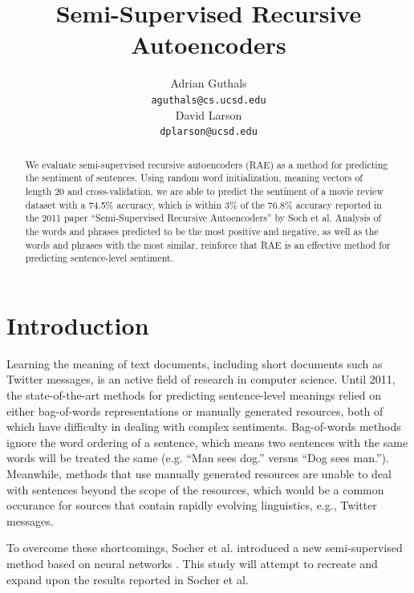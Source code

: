 \documentclass{article}
\title{Semi-Supervised Recursive Autoencoders}
\author{
Adrian Guthals \\
\texttt{aguthals@cs.ucsd.edu} \\
\And
David Larson \\
\texttt{dplarson@ucsd.edu} \\
}
\begin{document}
\maketitle


\begin{abstract}
We evaluate semi-supervised recursive autoencoders (RAE) as a method for predicting the sentiment of sentences. Using random word initialization, meaning vectors of length 20 and cross-validation, we are able to predict the sentiment of a movie review dataset with a 74.5\% accuracy, which is within 3\% of the 76.8\% accuracy reported in the 2011 paper ``Semi-Supervised Recursive Autoencoders'' by Soch et al. Analysis of the words and phrases predicted to be the most positive and negative, as well as the words and phrases with the most similar, reinforce that RAE is an effective method for predicting sentence-level sentiment.
\end{abstract}



\section{Introduction}
Learning the meaning of text documents, including short documents such as Twitter messages, is an active field of research in computer science. Until 2011, the state-of-the-art methods for predicting sentence-level meanings relied on either bag-of-words representations or manually generated resources, both of which have difficulty in dealing with complex sentiments.  Bag-of-words methods ignore the word ordering of a sentence, which means two sentences with the same words will be treated the same (e.g. ``Man sees dog.'' versus ``Dog sees man.''). Meanwhile, methods that use manually generated resources are unable to deal with sentences beyond the scope of the resources, which would be a common occurance for sources that contain rapidly evolving linguistics, e.g., Twitter messages.

To overcome these shortcomings, Socher et al. introduced a new semi-supervised method based on neural networks \cite{Socher}. This study will attempt to recreate and expand upon the results reported in Socher et al.



\end{document}

